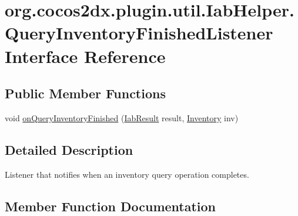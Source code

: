 \hypertarget{interfaceorg_1_1cocos2dx_1_1plugin_1_1util_1_1IabHelper_1_1QueryInventoryFinishedListener}{}\section{org.\+cocos2dx.\+plugin.\+util.\+Iab\+Helper.\+Query\+Inventory\+Finished\+Listener Interface Reference}
\label{interfaceorg_1_1cocos2dx_1_1plugin_1_1util_1_1IabHelper_1_1QueryInventoryFinishedListener}
\subsection*{Public Member Functions}
\begin{DoxyCompactItemize}
\item 
void \hyperlink{interfaceorg_1_1cocos2dx_1_1plugin_1_1util_1_1IabHelper_1_1QueryInventoryFinishedListener_aa6b3427fd2a15479b1a432e4e0bc6e60}{on\+Query\+Inventory\+Finished} (\hyperlink{classorg_1_1cocos2dx_1_1plugin_1_1util_1_1IabResult}{Iab\+Result} result, \hyperlink{classorg_1_1cocos2dx_1_1plugin_1_1util_1_1Inventory}{Inventory} inv)
\end{DoxyCompactItemize}


\subsection{Detailed Description}
Listener that notifies when an inventory query operation completes. 

\subsection{Member Function Documentation}
\mbox{\label{interfaceorg_1_1cocos2dx_1_1plugin_1_1util_1_1IabHelper_1_1QueryInventoryFinishedListener_aa6b3427fd2a15479b1a432e4e0bc6e60}} 
